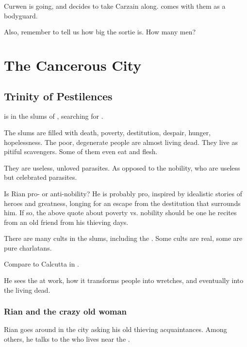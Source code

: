 Curwen is going, and decides to take Carzain along. 
 comes with them as a bodyguard. 

Also, remember to tell us how big the sortie is. How many men?







\section{The Cancerous City}







\subsection{Trinity of Pestilences}
 is in the slums of \Malcur, searching for . 

The slums are filled with death, poverty, destitution, despair, hunger, hopelessness. The poor, degenerate people are almost living dead. They live as pitiful scavengers. Some of them even eat \human{} and \scathaese{} flesh. 

They are useless, unloved parasites. As opposed to the nobility, who are useless but celebrated parasites. 

Is Rian pro- or anti-nobility? He is probably pro, inspired by idealistic stories of heroes and greatness, longing for an escape from the destitution that surrounds him. If so, the above quote about poverty vs. nobility should be one he recites from an old friend from his thieving days. 

There are many cults in the slums, including the . Some cults are real, some are pure charlatans. 

Compare to Calcutta in \cite{PoppyZBrite:CalcuttaLordofNerves}. 

He sees the  at work, how it transforms people into wretches, and eventually into the living dead. 





\subsubsection{Rian and the crazy old woman}
Rian goes around in the city asking his old thieving acquaintances. Among others, he talks to the  who lives near the . 

